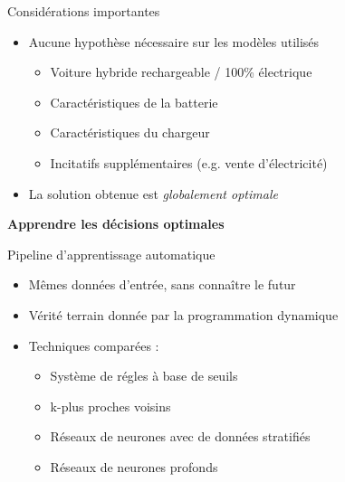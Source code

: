 \documentclass[french]{beamer}
\begin{document}
{ \begin{frame}{Considérations importantes}
 \begin{itemize}
 	\item Aucune hypothèse nécessaire sur les modèles utilisés
 	\begin{itemize}
 		\item Voiture hybride rechargeable / 100\% électrique
 		\item Caractéristiques de la batterie
 		\item Caractéristiques du chargeur
 		\item Incitatifs supplémentaires (e.g. vente d'électricité)
 	\end{itemize}
 	\item La solution obtenue est \emph{globalement optimale}
 \end{itemize}
 \end{frame}
 
 

{
\begin{frame}
\begin{center}
\huge \textbf{Apprendre les décisions optimales}
\end{center}
\end{frame}
}
\addtocounter{framenumber}{-1}

\begin{frame}{Pipeline d'apprentissage automatique}
\begin{itemize}
	\item Mêmes données d'entrée, sans connaître le futur
	\item Vérité terrain donnée par la programmation dynamique
	\item Techniques comparées :
	\begin{itemize}
		\item Système de régles à base de seuils
		\item k-plus proches voisins
		\item Réseaux de neurones avec de données stratifiés
		 \item Réseaux de neurones profonds
 
	\end{itemize}
\end{itemize}

\end{frame}


}
\end{document}
